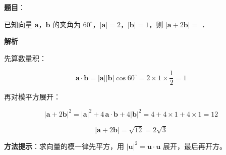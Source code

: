 \begin{answer}

\textbf{题目}：

已知向量 $\boldsymbol a$，$\boldsymbol b$ 的夹角为 $60^\circ$，$|\boldsymbol a|=2$，$|\boldsymbol b|=1$，则 $|\boldsymbol a+2\boldsymbol b|=$ \gkblank{}．

\textbf{解析}

先算数量积：

\nopagebreak[4]
\[\boldsymbol a\cdot\boldsymbol b=|\boldsymbol a||\boldsymbol b|\cos60^\circ=2\times1\times\frac12=1\]

再对模平方展开：

\nopagebreak[4]
\[|\boldsymbol a+2\boldsymbol b|^{2}=|\boldsymbol a|^{2}+4\,\boldsymbol a\cdot\boldsymbol b+4|\boldsymbol b|^{2}=4+4\times1+4\times1=12\]

\nopagebreak[4]
\[|\boldsymbol a+2\boldsymbol b|=\sqrt{12}=2\sqrt3\]

\begin{gktip}
\textbf{方法提示}：求向量的模一律先平方，用 $|\boldsymbol u|^{2}=\boldsymbol u\cdot\boldsymbol u$ 展开，最后再开方。
\end{gktip}


\par\medskip

\end{answer}
